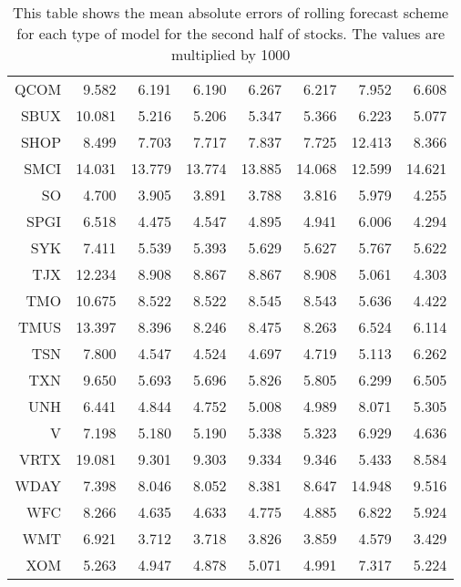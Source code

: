 \begin{table}[ht]
\begin{tabular}{rrrrrrrr}
  QCOM & 9.582 & 6.191 & 6.190 & 6.267 & 6.217 & 7.952 & 6.608 \\ 
  SBUX & 10.081 & 5.216 & 5.206 & 5.347 & 5.366 & 6.223 & 5.077 \\ 
  SHOP & 8.499 & 7.703 & 7.717 & 7.837 & 7.725 & 12.413 & 8.366 \\ 
  SMCI & 14.031 & 13.779 & 13.774 & 13.885 & 14.068 & 12.599 & 14.621 \\ 
  SO & 4.700 & 3.905 & 3.891 & 3.788 & 3.816 & 5.979 & 4.255 \\ 
  SPGI & 6.518 & 4.475 & 4.547 & 4.895 & 4.941 & 6.006 & 4.294 \\ 
  SYK & 7.411 & 5.539 & 5.393 & 5.629 & 5.627 & 5.767 & 5.622 \\ 
  TJX & 12.234 & 8.908 & 8.867 & 8.867 & 8.908 & 5.061 & 4.303 \\ 
  TMO & 10.675 & 8.522 & 8.522 & 8.545 & 8.543 & 5.636 & 4.422 \\ 
  TMUS & 13.397 & 8.396 & 8.246 & 8.475 & 8.263 & 6.524 & 6.114 \\ 
  TSN & 7.800 & 4.547 & 4.524 & 4.697 & 4.719 & 5.113 & 6.262 \\ 
  TXN & 9.650 & 5.693 & 5.696 & 5.826 & 5.805 & 6.299 & 6.505 \\ 
  UNH & 6.441 & 4.844 & 4.752 & 5.008 & 4.989 & 8.071 & 5.305 \\ 
  V & 7.198 & 5.180 & 5.190 & 5.338 & 5.323 & 6.929 & 4.636 \\ 
  VRTX & 19.081 & 9.301 & 9.303 & 9.334 & 9.346 & 5.433 & 8.584 \\ 
  WDAY & 7.398 & 8.046 & 8.052 & 8.381 & 8.647 & 14.948 & 9.516 \\ 
  WFC & 8.266 & 4.635 & 4.633 & 4.775 & 4.885 & 6.822 & 5.924 \\ 
  WMT & 6.921 & 3.712 & 3.718 & 3.826 & 3.859 & 4.579 & 3.429 \\ 
  XOM & 5.263 & 4.947 & 4.878 & 5.071 & 4.991 & 7.317 & 5.224 \\ 
   \hline
\end{tabular}
\caption[MAE rolling forecast (2)]{This table shows the mean absolute errors of rolling forecast scheme for each type of model for the second half of stocks. 
                     The values are multiplied by 1000} 
\label{Table:MAE_r_2}
\end{table}
